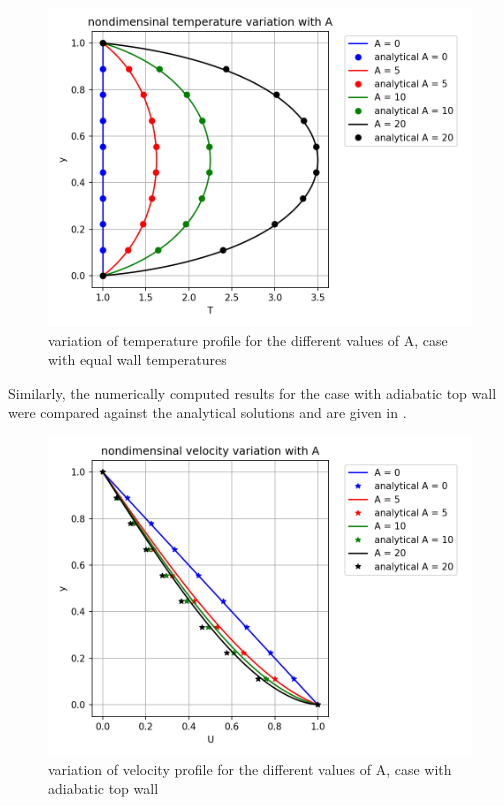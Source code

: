 \begin{figure}[!h]
   \centering
    \includegraphics[scale=0.6]{supporting_documents/01_equalWallTemperatures/T_profiles.png}
    \caption{variation of temperature profile for the different values of A, case with equal wall temperatures}
    \label{sol_ewt_t}
\end{figure}

\par Similarly, the numerically computed results for the case with adiabatic
top wall were compared against the analytical solutions and are given in
.

\begin{figure}[!h]
   \centering
    \includegraphics[scale=0.6]{supporting_documents/02_adiabaticWall/U_profiles.png}
    \caption{variation of velocity profile for the different values of A, case with adiabatic top wall}
    \label{sol_aw_u}
\end{figure}

